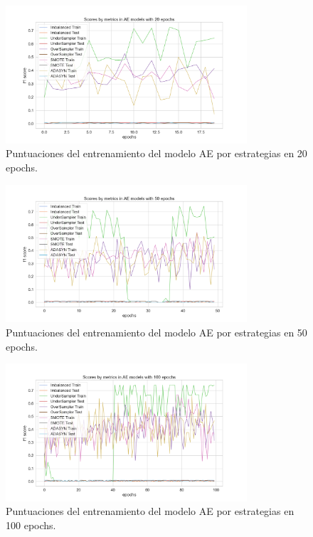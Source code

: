 \begin{figure}[h!]
	\centering
	\includegraphics[width=0.8\textwidth]{"figuras/Experimento5/AE/AE_20_train"}
	\caption{Puntuaciones del entrenamiento del modelo AE por estrategias en 20 epochs.}
	\label{an:32}
\end{figure}

\begin{figure}[h!]
	\centering
	\includegraphics[width=0.8\textwidth]{"figuras/Experimento5/AE/AE_50_train"}
	\caption{Puntuaciones del entrenamiento del modelo AE por estrategias en 50 epochs.}
	\label{an:33}
\end{figure}

\begin{figure}[h!]
	\centering
	\includegraphics[width=0.8\textwidth]{"figuras/Experimento5/AE/AE_100_train"}
	\caption{Puntuaciones del entrenamiento del modelo AE por estrategias en 100 epochs.}
	\label{an:34}
\end{figure}

